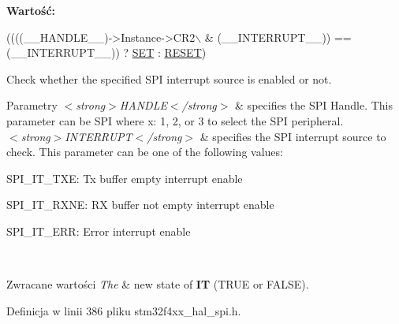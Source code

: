 {\bfseries Wartość\+:}
\begin{DoxyCode}
((((\_\_HANDLE\_\_)->Instance->CR2\(\backslash\)
                                                              & (\_\_INTERRUPT\_\_)) == (\_\_INTERRUPT\_\_)) ? 
      \hyperlink{group___exported__types_gga89136caac2e14c55151f527ac02daaffab44c8101cc294c074709ec1b14211792}{SET} : \hyperlink{group___exported__types_gga89136caac2e14c55151f527ac02daaffa589b7d94a3d91d145720e2fed0eb3a05}{RESET})
\end{DoxyCode}


Check whether the specified S\+PI interrupt source is enabled or not. 


\begin{DoxyParams}{Parametry}
{\em $<$strong$>$\+H\+A\+N\+D\+L\+E$<$/strong$>$} & specifies the S\+PI Handle. This parameter can be S\+PI where x\+: 1, 2, or 3 to select the S\+PI peripheral. \\
\hline
{\em $<$strong$>$\+I\+N\+T\+E\+R\+R\+U\+P\+T$<$/strong$>$} & specifies the S\+PI interrupt source to check. This parameter can be one of the following values\+: \begin{DoxyItemize}
\item S\+P\+I\+\_\+\+I\+T\+\_\+\+T\+XE\+: Tx buffer empty interrupt enable \item S\+P\+I\+\_\+\+I\+T\+\_\+\+R\+X\+NE\+: RX buffer not empty interrupt enable \item S\+P\+I\+\_\+\+I\+T\+\_\+\+E\+RR\+: Error interrupt enable \end{DoxyItemize}
\\
\hline
\end{DoxyParams}

\begin{DoxyRetVals}{Zwracane wartości}
{\em The} & new state of {\bfseries IT} (T\+R\+UE or F\+A\+L\+SE). \\
\hline
\end{DoxyRetVals}


Definicja w linii 386 pliku stm32f4xx\+\_\+hal\+\_\+spi.\+h.

\mbox{\label{group___s_p_i___exported___macros_ga0d846f9517715960873e854b4a0790b0}} 
